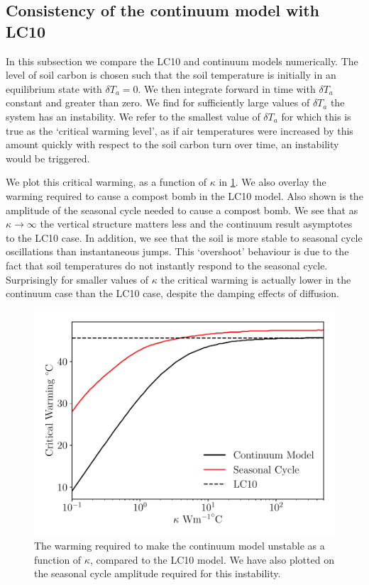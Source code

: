 \subsection{Consistency of the continuum model with LC10}
\label{sec:consistency_with_LC10}
In this subsection we compare the LC10 and continuum models numerically. The level of soil carbon is chosen such that the soil temperature is initially in an equilibrium state with $\delta T_{a} = 0$.
We then integrate forward in time with $\delta T_a$ constant and greater than zero. We find for sufficiently large values of $\delta T_a$ the system has an instability.
We refer to the smallest value of $\delta T_a$ for which this is true as the `critical warming level', as if air temperatures were increased by this amount quickly with respect to the soil carbon turn over time,
an instability would be triggered.

We plot this critical warming, as a function of $\kappa$ in \cref{fig:comparison_with_lc10}. We also overlay the warming required to cause a compost bomb in the LC10
model. Also shown is the amplitude of the seasonal cycle needed to cause a compost bomb.
We see that as $\kappa\rightarrow\infty$ the vertical structure matters less and the continuum result asymptotes to the LC10 case. In addition, we see that the soil is more stable
to seasonal cycle oscillations than instantaneous jumps. This `overshoot' behaviour\cite{Ritchie2019,Ritchie2021} is due to the fact that soil temperatures do not instantly respond to the seasonal cycle.
Surprisingly for smaller
values of $\kappa$ the critical warming is actually lower in the continuum case than the LC10 case, despite the damping effects of diffusion.
\begin{figure}
  \centering
  \includegraphics[keepaspectratio,scale=0.5]{dimensional_continuum_vs_lc10}
  \caption[Critcal warming level in the continuum compost bomb]{The warming required to make the continuum model unstable as a function of $\kappa$, compared to the LC10 model. We have also plotted on the seasonal cycle amplitude required for this instability.}
  \label{fig:comparison_with_lc10}
\end{figure}

